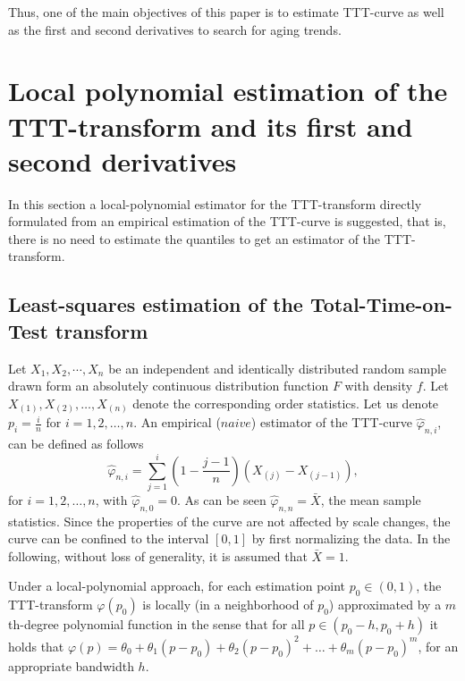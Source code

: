 \documentclass[preprint,12pt]{elsarticle}
\begin{document}
Thus, one of the main objectives of this paper is to estimate TTT-curve as well as  the first and second derivatives to search for aging trends.

%
\section{Local polynomial estimation of the TTT-transform and its first and second derivatives}\label{locpol}
In this section  a local-polynomial estimator for the TTT-transform directly formulated from an empirical estimation of the TTT-curve is suggested, that is, there is no need to estimate the quantiles to get an estimator of the TTT-transform.

%
\subsection{Least-squares estimation of the Total-Time-on-Test transform}

Let $X_1,X_2,\cdots,X_n$ be an independent and identically distributed random sample drawn form an absolutely continuous distribution function $F$ with density $f$. Let $X_{(1)},X_{(2)},\ldots,X_{(n)}$ denote the corresponding order statistics. Let us denote $p_i=\frac{i}{n}$ for $i= 1,2, \ldots, n$. An empirical ($naive$) estimator of the TTT-curve $\widehat{\varphi}_{n,i}$, can be defined as follows
%
\begin{equation}\label{empi}
\widehat{\varphi}_{n,i}= \sum_{j=1}^i \left(1-\frac{j-1}{n}\right) \left(X_{(j)}-X_{(j-1)}\right),
\end{equation}
for $i=1,2,\ldots,n$, with $\widehat{\varphi}_{n,0}=0$. As can be seen $\widehat{\varphi}_{n,n}=\bar{X}$, the mean sample statistics. Since the properties of the curve are not affected by scale changes, the curve can be confined to the interval $[0,1]$ by first normalizing the data. In the following, without loss of generality, it is assumed that $\bar{X}=1$.

Under a local-polynomial approach, for each estimation point $p_0 \in (0,1)$, the TTT-transform $\varphi(p_0)$ is locally (in a neighborhood of $p_0$) approximated by a $m$th-degree polynomial function in the sense that for all $p \in \left(p_0-h,p_0+h\right)$ it holds that $\varphi(p)=\theta_0+\theta_1(p-p_0)+\theta_2(p-p_0)^2+\ldots+\theta_m(p-p_0)^m$, for an appropriate bandwidth $h$. 
\end{document}
